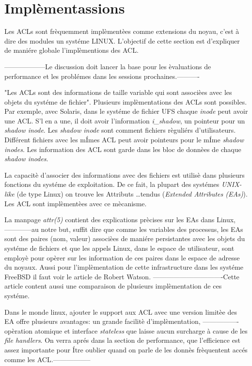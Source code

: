 \section{Implèmentassions}
 
Les ACLs sont frèquemment implèmentèes comme extensions du noyau, c'est à dire des modules un systéme LINUX. L'objectif de cette section est d'expliquer de maniére globale l'implèmentions des ACL. 

------------------Le discussion doit lancer la base pour les èvaluations de performance et les problémes dans les sessions prochaines.----------
 
"Les ACLs sont des informations de taille variable qui sont associèes avec les objets du systéme de fichier"\cite{aclsuse}. Plusieurs implèmentations des ACLs sont possibles. Par exemple, avec Solaris, dans le systéme de fichier UFS\cite{acl_permission} chaque \emph{inode} peut avoir une ACL. S'l en a une, il doit avoir l'information \emph{i\_shadow}, un pointeur pour un \emph{shadow inode}. Les \emph{shadow inode} sont comment fichiers règuliérs d'utilisateurs. Différent fichiers avec les mÍmes ACL peut avoir pointeurs pour le mÍme \emph{shadow inodes}. Les information des ACL sont garde dans les bloc de donnèes de chaque \emph{shadow inodes}.
 
La capacitè d'associer des informations avec des fichiers est utilisè dans plusieurs fonctions du systéme de exploitation. De ce fait, la plupart des systémes \emph{UNIX-like} (de type Linux) on trouve les Attributs …tendus (\emph{Extended Attributes (EAs)}). Les ACL sont implèmentèes avec ce mècanisme.
 
La manpage \cite{aclsuse} \emph{attr(5)} contient des explications prècises sur les EAs dans Linux, ------------au notre but, suffit dire que comme les variables des processus, les EAs sont des paires (nom, valeur) associèes de maniére persistantes avec les objets du systéme de fichiers et que les appels Linux, dans le espace de utilisateur, sont employè pour opèrer sur les information de ces paires dans le espace de adresse du noyaux. Aussi pour l'implèmentation de cette infrastructure dans les systéme FreeBSD il faut voir le article de Robert Watson\cite{trust}. -------------------------------Cette article content aussi une comparaison de plusieurs implèmentation de ces systéme.
 
Dans le monde linux, ajouter le support aux ACL avec une version limitèe des EA offre plusieurs avantages: un grande facilitè d'implèmentation, ----------------opèration atomique et interface \emph{stateless} que laisse aucun surcharge à cause de les \emph{file handlers}. On verra aprés dans la section de performance, que l'efficience est assez importante pour Ítre oublier quand on parle de les donnès frèquentent accés comme les ACL.-----------------
 
